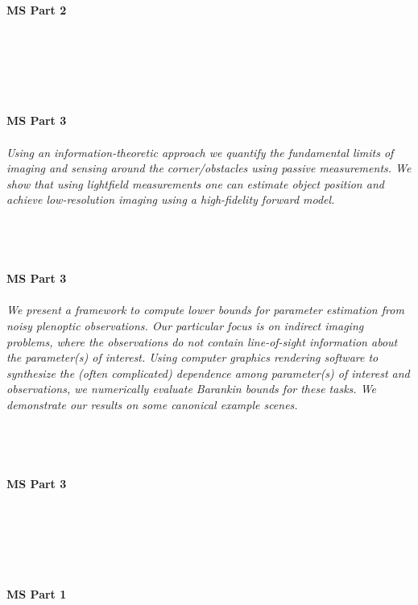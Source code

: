 \begin{multicols}{2}
    \\\\
    \noindent\textbf{MS Part 2}\\
\\  
    \textit{}\\
\\ 
    \\
    \\\\
    \noindent\textbf{MS Part 3}\\
\\  
    \textit{Using an information-theoretic approach we quantify the fundamental limits of imaging and sensing around the corner/obstacles using passive measurements. We show that using lightfield measurements one can estimate object position and achieve low-resolution imaging using a high-fidelity forward model.}\\
\\ 
    \\
    \\\\
    \noindent\textbf{MS Part 3}\\
\\  
    \textit{We present a framework to compute lower bounds for parameter estimation from noisy plenoptic observations. Our particular focus is on indirect imaging problems, where the observations do not contain line-of-sight information about the parameter(s) of interest. Using computer graphics rendering software to synthesize the (often complicated) dependence among parameter(s) of interest and observations, we numerically evaluate Barankin bounds for these tasks.  We demonstrate our results on some canonical example scenes.}\\
\\ 
    \\
    \\\\
    \noindent\textbf{MS Part 3}\\
\\  
    \textit{}\\
\\ 
    \\
    \\\\
    \noindent\textbf{MS Part 1}\\

\end{multicols}
